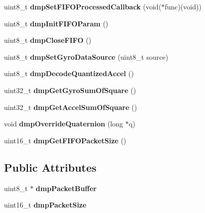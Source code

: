 \begin{DoxyCompactItemize}
\item 
\mbox{\label{class_m_p_u6050_a3dd7662a5e7ef6bfc017c1b6237960f8}} 
uint8\+\_\+t {\bfseries dmp\+Set\+F\+I\+F\+O\+Processed\+Callback} (void($\ast$func)(void))
\item 
\mbox{\label{class_m_p_u6050_ab6b2641479b580a88dbcc36a225a1ff6}} 
uint8\+\_\+t {\bfseries dmp\+Init\+F\+I\+F\+O\+Param} ()
\item 
\mbox{\label{class_m_p_u6050_a9040079b7f934aa2f84f76004aea7e6f}} 
uint8\+\_\+t {\bfseries dmp\+Close\+F\+I\+FO} ()
\item 
\mbox{\label{class_m_p_u6050_a235b9911e8fc8b3674cc9ffcfa03e107}} 
uint8\+\_\+t {\bfseries dmp\+Set\+Gyro\+Data\+Source} (uint8\+\_\+t source)
\item 
\mbox{\label{class_m_p_u6050_a39ed46d7a593d93fbf147318331dd655}} 
uint8\+\_\+t {\bfseries dmp\+Decode\+Quantized\+Accel} ()
\item 
\mbox{\label{class_m_p_u6050_a0df6f1422e81759cc8fc90afe2c7c19d}} 
uint32\+\_\+t {\bfseries dmp\+Get\+Gyro\+Sum\+Of\+Square} ()
\item 
\mbox{\label{class_m_p_u6050_ab98f49d9a80425fb27a2bc54ba39ae63}} 
uint32\+\_\+t {\bfseries dmp\+Get\+Accel\+Sum\+Of\+Square} ()
\item 
\mbox{\label{class_m_p_u6050_a7d2adbc6952716186382f33e6987acd1}} 
void {\bfseries dmp\+Override\+Quaternion} (long $\ast$q)
\item 
\mbox{\label{class_m_p_u6050_ac91c7e1c0647a6269b890e04d2fabce9}} 
uint16\+\_\+t {\bfseries dmp\+Get\+F\+I\+F\+O\+Packet\+Size} ()
\end{DoxyCompactItemize}
\subsection*{Public Attributes}
\begin{DoxyCompactItemize}
\item 
\mbox{\label{class_m_p_u6050_aabbe31187ccf2d74a0539b9dc2927e19}} 
uint8\+\_\+t $\ast$ {\bfseries dmp\+Packet\+Buffer}
\item 
\mbox{\label{class_m_p_u6050_a99f1e24e65565db5771435c8f2a2a09c}} 
uint16\+\_\+t {\bfseries dmp\+Packet\+Size}
\end{DoxyCompactItemize}


